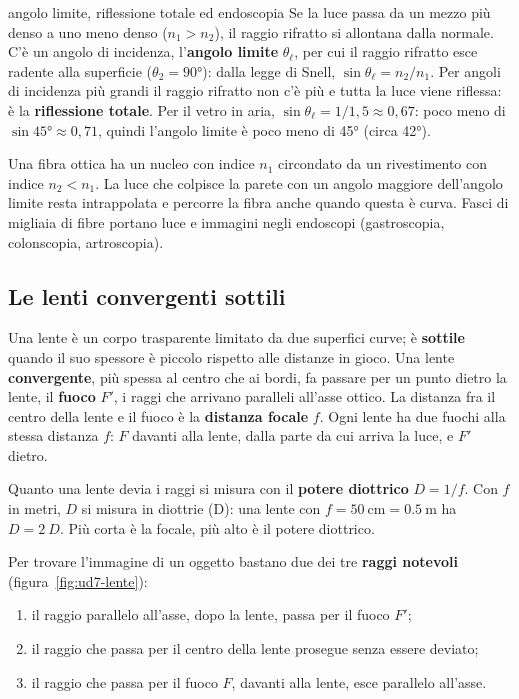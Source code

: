 \begin{approfondimento}{angolo limite, riflessione totale ed endoscopia}
Se la luce passa da un mezzo più denso a uno meno denso ($n_1 > n_2$), il raggio rifratto si allontana dalla normale. C'è un angolo di incidenza, l'\textbf{angolo limite} $\theta_\ell$, per cui il raggio rifratto esce radente alla superficie ($\theta_2 = \ang{90}$): dalla legge di Snell, $\sin\theta_\ell = n_2/n_1$. Per angoli di incidenza più grandi il raggio rifratto non c'è più e tutta la luce viene riflessa: è la \textbf{riflessione totale}. Per il vetro in aria, $\sin\theta_\ell = 1/1{,}5 \approx 0{,}67$: poco meno di $\sin\ang{45} \approx 0{,}71$, quindi l'angolo limite è poco meno di \ang{45} (circa \ang{42}).

Una fibra ottica ha un nucleo con indice $n_1$ circondato da un rivestimento con indice $n_2 < n_1$. La luce che colpisce la parete con un angolo maggiore dell'angolo limite resta intrappolata e percorre la fibra anche quando questa è curva. Fasci di migliaia di fibre portano luce e immagini negli endoscopi (gastroscopia, colonscopia, artroscopia).
\end{approfondimento}

\subsection{Le lenti convergenti sottili}

Una lente è un corpo trasparente limitato da due superfici curve; è \textbf{sottile} quando il suo spessore è piccolo rispetto alle distanze in gioco. Una lente \textbf{convergente}, più spessa al centro che ai bordi, fa passare per un punto dietro la lente, il \textbf{fuoco} $F'$, i raggi che arrivano paralleli all'asse ottico. La distanza fra il centro della lente e il fuoco è la \textbf{distanza focale} $f$. Ogni lente ha due fuochi alla stessa distanza $f$: $F$ davanti alla lente, dalla parte da cui arriva la luce, e $F'$ dietro.

Quanto una lente devia i raggi si misura con il \textbf{potere diottrico} $D = 1/f$. Con $f$ in metri, $D$ si misura in diottrie (D): una lente con $f = \SI{50}{\centi\metre} = \SI{0,5}{\metre}$ ha $D = \SI{2}{D}$. Più corta è la focale, più alto è il potere diottrico.

Per trovare l'immagine di un oggetto bastano due dei tre \textbf{raggi notevoli} (figura~\ref{fig:ud7-lente}):
\begin{enumerate}
  \item il raggio parallelo all'asse, dopo la lente, passa per il fuoco $F'$;
  \item il raggio che passa per il centro della lente prosegue senza essere deviato;
  \item il raggio che passa per il fuoco $F$, davanti alla lente, esce parallelo all'asse.
\end{enumerate}


